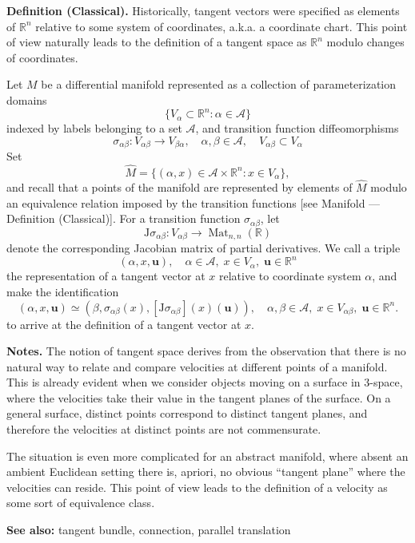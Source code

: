 \documentclass{article}
\newcommand{\reals}{\mathbb{R}}
\newcommand{\cA}{\mathcal{A}}
\newcommand{\hM}{\hat{M}}
\newcommand{\Mat}{\mathop{\mathrm{Mat}}\nolimits}
\newcommand{\rJ}{\mathrm{J}}
\newcommand{\bu}{\mathbf{u}}
\begin{document}
{\bf Definition (Classical).}  Historically, tangent vectors were
specified as elements of $\reals^n$ relative to some system of
coordinates, a.k.a. a coordinate chart. This point of view naturally
leads to the definition of a tangent space as $\reals^n$ modulo changes
of coordinates.  

Let $M$ be a differential manifold represented as a collection of
parameterization domains
$$\{V_\alpha\subset\reals^n:\alpha\in \cA\}$$ indexed by labels
belonging to a set $\cA$, and 
transition function diffeomorphisms
$$\sigma_{\alpha\beta}:V_{\alpha\beta}\rightarrow
V_{\beta\alpha},\quad \alpha,\beta\in \cA,\quad V_{\alpha\beta}\subset
V_\alpha$$
Set 
$$\hM = \{ (\alpha,x)\in \cA\times \reals^n: x\in V_\alpha\},$$
and recall that a points of the manifold are represented by elements
of $\hM$ modulo an equivalence relation imposed by the transition functions
[see Manifold --- Definition (Classical)].
For a transition function $\sigma_{\alpha\beta}$,  let
$$\rJ\sigma_{\alpha\beta}:V_{\alpha\beta}\rightarrow
\Mat_{n,n}(\reals)$$
denote the corresponding Jacobian matrix of partial derivatives.   We
call a triple
$$(\alpha,x,\bu),\quad \alpha\in\cA,\; x\in V_\alpha,\; \bu\in
\reals^n$$
the representation of a tangent vector at $x$ relative to coordinate
system $\alpha$, and make the identification
$$(\alpha,x,\bu) \simeq
(\beta,\sigma_{\alpha\beta}(x),[\rJ\sigma_{\alpha\beta}](x)(\bu)),\quad
\alpha,\beta\in \cA,\; x\in V_{\alpha\beta},\; \bu \in \reals^n.$$
to arrive at the definition of a tangent vector at $x$.


{\bf Notes.} The notion of tangent space derives from the observation
that there is no natural way to relate and compare velocities at
different points of a manifold.  This is already evident when we
consider objects moving on a surface in 3-space, where the velocities
take their value in the tangent planes of the surface. On a general
surface, distinct points correspond to distinct tangent planes, and
therefore the velocities at distinct points are not commensurate.

The situation is even more complicated for an abstract manifold, where
absent an ambient Euclidean setting there is, apriori, no obvious
``tangent plane'' where the velocities can reside.  This point of view
leads to the definition of a velocity as some sort of equivalence
class.


{\bf See also:} tangent bundle, connection, parallel translation
\end{document}

